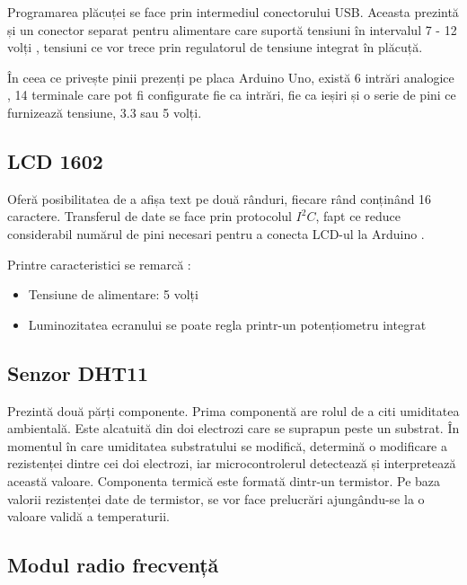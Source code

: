 	Programarea plăcuței se face prin intermediul conectorului USB. Aceasta prezintă și un conector separat pentru alimentare care suportă tensiuni în intervalul 7 - 12 volți \cite{arduino}, tensiuni ce vor trece prin regulatorul de tensiune integrat în plăcuță.

	În ceea ce privește pinii prezenți pe placa Arduino Uno, există 6 intrări analogice \cite{arduino}, 14 terminale care pot fi configurate fie ca intrări, fie ca ieșiri \cite{arduino} și o serie de pini ce furnizează tensiune, 3.3 sau 5 volți.

\subsection{LCD 1602}

	Oferă posibilitatea de a afișa text pe două rânduri, fiecare rând conținând 16 caractere. Transferul de date se face prin protocolul $I^2C$, fapt ce reduce considerabil numărul de pini necesari pentru a conecta LCD-ul la Arduino \cite{lcd}.

\vspace{1em}

	Printre caracteristici se remarcă \cite{lcd}:
 		\begin{itemize}
			\setlength{\itemindent}{2em}
			\itemsep0em
			\item Tensiune de alimentare: 5 volți 
			\item Luminozitatea ecranului se poate regla printr-un potențiometru integrat
		\end{itemize} 
	
\subsection{Senzor DHT11}

	Prezintă două părți componente. Prima componentă are rolul de a citi umiditatea ambientală. Este alcatuită din doi electrozi care se suprapun peste un substrat. În momentul în care umiditatea substratului se modifică, determină o modificare a rezistenței dintre cei doi electrozi, iar microcontrolerul detectează și interpretează această valoare. Componenta termică este formată dintr-un termistor. Pe baza valorii rezistenței date de termistor, se vor face prelucrări ajungându-se la o valoare validă a temperaturii.

\subsection{Modul radio frecvență}

